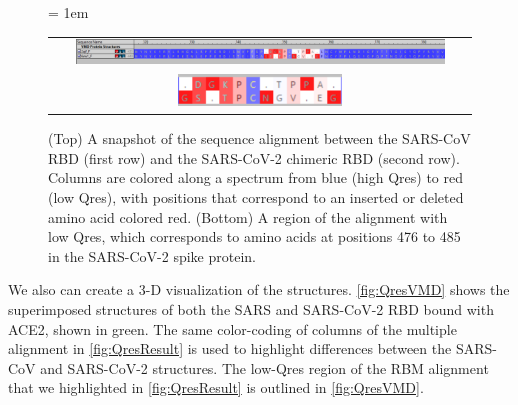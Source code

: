 \begin{figure}[h]
	\centering
	\tabcolsep = 1em
	\mySfFamily
	\begin{tabular}{c}
		\includegraphics[width = 0.9\textwidth]{../images/QresResult.png} \\
		\includegraphics[width = 0.4\textwidth]{../images/QresResult_cropped.png} \\
	\end{tabular}
	\caption{(Top) A snapshot of the sequence alignment between the SARS-CoV RBD (first row) and the SARS-CoV-2 chimeric RBD (second row). Columns are colored along a spectrum from blue (high Qres) to red (low Qres), with positions that correspond to an inserted or deleted amino acid colored red. (Bottom) A region of the alignment with low Qres, which corresponds to amino acids at positions 476 to 485 in the SARS-CoV-2 spike protein.}
	\label{fig:QresResult}
\end{figure}

We also can create a 3-D visualization of the structures. \autoref{fig:QresVMD} shows the superimposed structures of both the SARS and SARS-CoV-2 RBD bound with ACE2, shown in green. The same color-coding of columns of the multiple alignment in \autoref{fig:QresResult} is used to highlight differences between the SARS-CoV and SARS-CoV-2 structures. The low-Qres region of the RBM alignment that we highlighted in \autoref{fig:QresResult} is outlined in \autoref{fig:QresVMD}.\\

